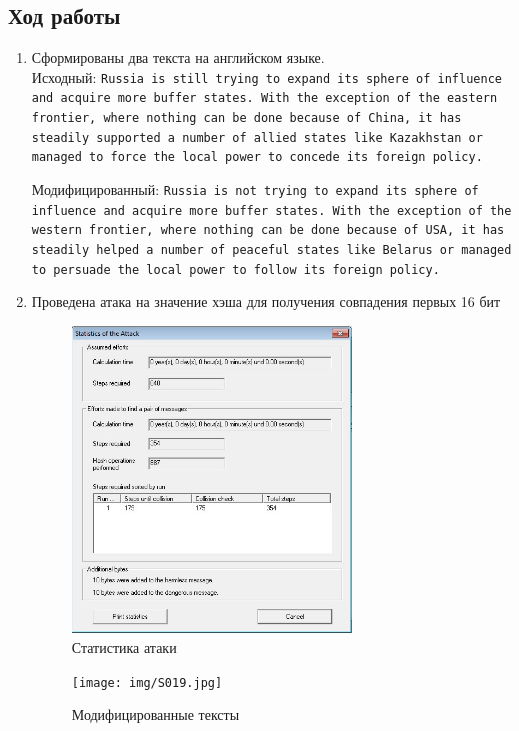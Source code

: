 \documentclass[a4paper, 14pt]{extarticle}
\begin{document}
\subsection{Ход работы}
\begin{enumerate}
    \item Сформированы два текста на английском языке. \\
        Исходный: \texttt{Russia is still trying to expand its sphere of influence and acquire more buffer states. With the exception of the eastern frontier, where nothing can be done because of China, it has steadily supported a number of allied states like Kazakhstan or managed to force the local power to concede its foreign policy.}

        Модифицированный: \texttt{Russia is not trying to expand its sphere of influence and acquire more buffer states. With the exception of the western frontier, where nothing can be done because of USA, it has steadily helped a number of peaceful states like Belarus or managed to persuade the local power to follow its foreign policy.} 
    \item Проведена атака на значение хэша для получения совпадения первых 16 бит
        \begin{figure}[h]
            \centering
            \includegraphics[width=0.7\textwidth]{img/S018.jpg}
            \caption{Статистика атаки}
        \end{figure}

        \begin{figure}[h]
            \centering
            \texttt{[image: img/S019.jpg]}
            \caption{Модифицированные тексты}%
            \label{img:}
        \end{figure}


\end{enumerate}
\end{document}
